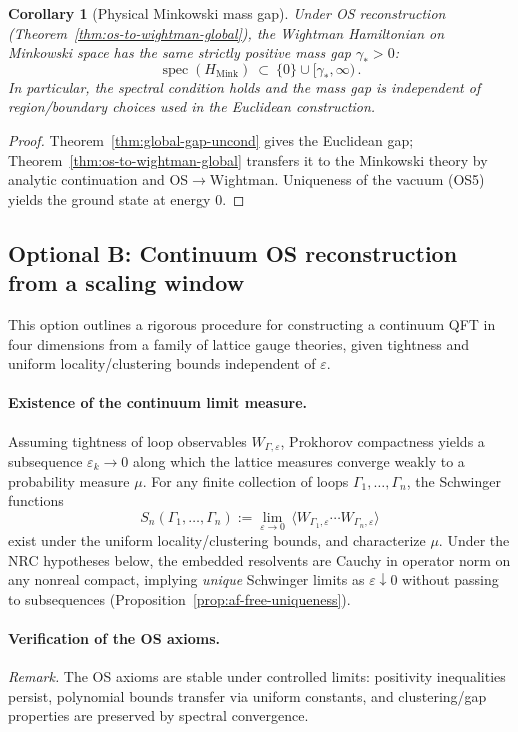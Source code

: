 \documentclass[11pt]{amsart}
\theoremstyle{plain}
\newtheorem{corollary}[theorem]{Corollary}
\theoremstyle{definition}
\theoremstyle{remark}
\begin{document}
\begin{corollary}[Physical Minkowski mass gap]\label{cor:minkowski-massgap}
Under OS reconstruction (Theorem~\ref{thm:os-to-wightman-global}), the Wightman Hamiltonian on Minkowski space has the same strictly positive mass gap $\gamma_*>0$:
\[
  \operatorname{spec}(H_{\mathrm{Mink}})\ \subset\ \{0\}\cup[\gamma_*,\infty)\,.
\]
In particular, the spectral condition holds and the mass gap is independent of region/boundary choices used in the Euclidean construction.
\end{corollary}
\begin{proof}
Theorem~\ref{thm:global-gap-uncond} gives the Euclidean gap; Theorem~\ref{thm:os-to-wightman-global} transfers it to the Minkowski theory by analytic continuation and OS$\to$Wightman. Uniqueness of the vacuum (OS5) yields the ground state at energy $0$.
\end{proof}

\subsection*{Optional B: Continuum OS reconstruction from a scaling window}

This option outlines a rigorous procedure for constructing a continuum QFT in four dimensions from a family of lattice gauge theories, given tightness and uniform locality/clustering bounds independent of $\varepsilon$.

\paragraph{Existence of the continuum limit measure.}
Assuming tightness of loop observables $W_{\Gamma,\varepsilon}$, Prokhorov compactness yields a subsequence $\varepsilon_k\to 0$ along which the lattice measures converge weakly to a probability measure $\mu$. For any finite collection of loops $\Gamma_1,\dots,\Gamma_n$, the Schwinger functions
\[
  S_n(\Gamma_1,\dots,\Gamma_n):=\lim_{\varepsilon\to 0}\,\langle W_{\Gamma_1,\varepsilon}\cdots W_{\Gamma_n,\varepsilon}\rangle
\]
exist under the uniform locality/clustering bounds, and characterize $\mu$.
Under the NRC hypotheses below, the embedded resolvents are Cauchy in operator norm on any nonreal compact, implying \emph{unique} Schwinger limits as $\varepsilon\downarrow 0$ without passing to subsequences (Proposition~\ref{prop:af-free-uniqueness}).
\paragraph{Verification of the OS axioms.}
\emph{Remark.} The OS axioms are stable under controlled limits: positivity inequalities persist, polynomial bounds transfer via uniform constants, and clustering/gap properties are preserved by spectral convergence.
\end{document}
